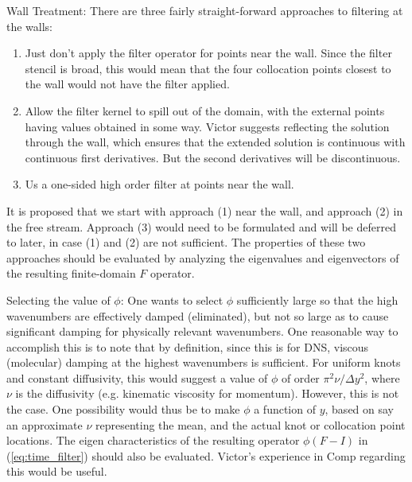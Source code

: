 Wall Treatment: There are three fairly straight-forward
approaches to filtering at the walls:
\begin{enumerate}
\item Just don't apply the filter operator for points near the
      wall. Since the filter stencil is broad, this would mean that the
      four collocation points closest to the wall would not have the
      filter applied.
\item Allow the filter kernel to spill out of the domain, with the
      external points having values obtained in some way. Victor
      suggests reflecting the solution through the wall, which ensures
      that the extended solution is continuous with continuous first
      derivatives. But the second derivatives will be discontinuous.
\item Us a one-sided high order filter at points near the wall.
\end{enumerate}
It is proposed that we start with approach (1) near the wall, and
approach (2) in the free stream. Approach (3) would need to be
formulated and will be deferred to later, in case (1) and (2)  are not
sufficient. The properties of these two approaches should be evaluated
by analyzing the eigenvalues and eigenvectors of the resulting
finite-domain $F$ operator.

Selecting the value of $\phi$:
One wants to select $\phi$ sufficiently large so that the high
wavenumbers are effectively damped (eliminated), but not so large as to
cause significant damping for physically relevant wavenumbers. One
reasonable way to accomplish this is to note that by definition, since
this is for DNS, viscous (molecular) damping at the highest wavenumbers
is sufficient. For uniform knots and constant diffusivity, this would
suggest a value of $\phi$ of order $\pi^2\nu/\Delta y^2$, where $\nu$ is
the diffusivity (e.g. kinematic viscosity for momentum). However, this
is not the case. One possibility would thus be to make $\phi$ a function
of $y$, based on say an approximate $\nu$ representing the mean, and the
actual knot or collocation point locations. The eigen characteristics of
the resulting operator $\phi(F-I)$ in (\ref{eq:time_filter}) should also
be evaluated. Victor's experience in Comp regarding this would be useful.

